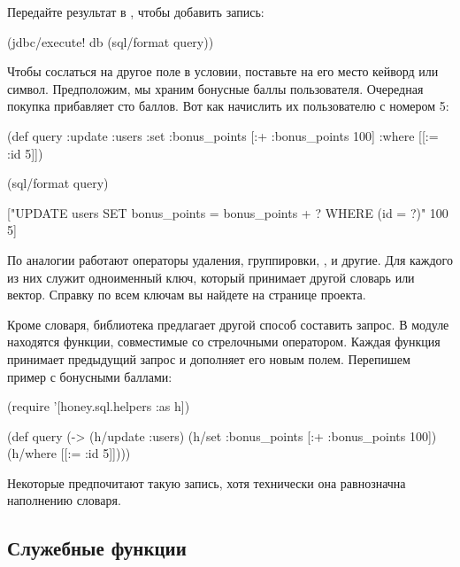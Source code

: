 \pagebreaklarge

Передайте результат в , чтобы добавить запись:

\begin{english}
  \begin{clojure}
(jdbc/execute! db (sql/format query))
  \end{clojure}
\end{english}

Чтобы сослаться на другое поле в условии, поставьте на его место кейворд или символ. Предположим, мы храним бонусные баллы пользователя. Очередная покупка прибавляет сто баллов. Вот как начислить их пользователю с номером 5:

\begin{english}
  \begin{clojure}
(def query
  {:update :users
   :set {:bonus_points [:+ :bonus_points 100]}
   :where [[:= :id 5]]})

(sql/format query)

["UPDATE users
  SET bonus_points = bonus_points + ?
  WHERE (id = ?)" 100 5]
  \end{clojure}
\end{english}

По аналогии работают операторы удаления, группировки, ,  и другие. Для каждого из них служит одноименный ключ, который принимает другой словарь или вектор. Справку по всем ключам вы найдете на странице проекта.

Кроме словаря, библиотека предлагает другой способ составить запрос. В модуле  находятся функции, совместимые со стрелочными оператором. Каждая функция принимает предыдущий запрос и дополняет его новым полем. Перепишем пример с бонусными баллами:

\begin{english}
  \begin{clojure}
(require '[honey.sql.helpers :as h])

(def query
  (-> (h/update :users)
      (h/set {:bonus_points [:+ :bonus_points 100]})
      (h/where [[:= :id 5]])))
  \end{clojure}
\end{english}

Некоторые предпочитают такую запись, хотя технически она равнозначна наполнению словаря.

\subsection{Служебные функции}

